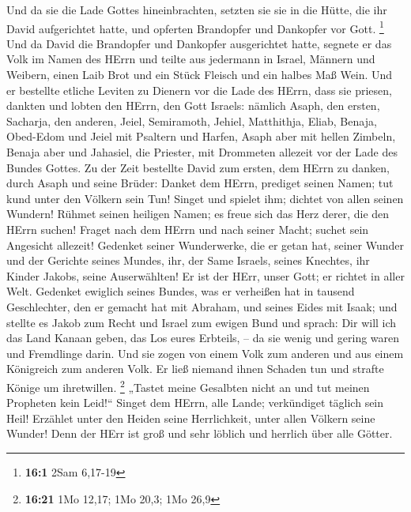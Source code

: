  Und da sie die Lade Gottes hineinbrachten, setzten sie
sie in die Hütte, die ihr David aufgerichtet hatte, und opferten
Brandopfer und Dankopfer vor Gott. \footnote{\textbf{16:1} 2Sam 6,17-19}
 Und da David die Brandopfer und Dankopfer ausgerichtet
hatte, segnete er das Volk im Namen des HErrn  und teilte
aus jedermann in Israel, Männern und Weibern, einen Laib Brot und ein
Stück Fleisch und ein halbes Maß Wein.  Und er bestellte
etliche Leviten zu Dienern vor die Lade des HErrn, dass sie priesen,
dankten und lobten den HErrn, den Gott Israels:  nämlich
Asaph, den ersten, Sacharja, den anderen, Jeiel, Semiramoth, Jehiel,
Matthithja, Eliab, Benaja, Obed-Edom und Jeiel mit Psaltern und Harfen,
Asaph aber mit hellen Zimbeln,  Benaja aber und Jahasiel,
die Priester, mit Drommeten allezeit vor der Lade des Bundes Gottes.
 Zu der Zeit bestellte David zum ersten, dem HErrn zu
danken, durch Asaph und seine Brüder:  Danket dem HErrn,
prediget seinen Namen; tut kund unter den Völkern sein Tun!
 Singet und spielet ihm; dichtet von allen seinen Wundern!
 Rühmet seinen heiligen Namen; es freue sich das Herz
derer, die den HErrn suchen!  Fraget nach dem HErrn und
nach seiner Macht; suchet sein Angesicht allezeit! 
Gedenket seiner Wunderwerke, die er getan hat, seiner Wunder und der
Gerichte seines Mundes,  ihr, der Same Israels, seines
Knechtes, ihr Kinder Jakobs, seine Auserwählten!  Er ist
der HErr, unser Gott; er richtet in aller Welt.  Gedenket
ewiglich seines Bundes, was er verheißen hat in tausend Geschlechter,
 den er gemacht hat mit Abraham, und seines Eides mit
Isaak;  und stellte es Jakob zum Recht und Israel zum
ewigen Bund  und sprach: Dir will ich das Land Kanaan
geben, das Los eures Erbteils, --  da sie wenig und
gering waren und Fremdlinge darin.  Und sie zogen von
einem Volk zum anderen und aus einem Königreich zum anderen Volk.
 Er ließ niemand ihnen Schaden tun und strafte Könige um
ihretwillen. \footnote{\textbf{16:21} 1Mo 12,17; 1Mo 20,3; 1Mo 26,9}
 „Tastet meine Gesalbten nicht an und tut meinen
Propheten kein Leid!{}``  Singet dem HErrn, alle Lande;
verkündiget täglich sein Heil!  Erzählet unter den Heiden
seine Herrlichkeit, unter allen Völkern seine Wunder! 
Denn der HErr ist groß und sehr löblich und herrlich über alle Götter.
